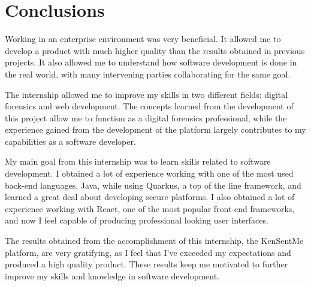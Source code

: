 

\chapter{Conclusions}
\label{ch:conclusion}

Working in an enterprise environment was very beneficial.
It allowed me to develop a product with much higher quality than the results obtained in previous projects.
It also allowed me to understand how software development is done in the real world, with many intervening parties collaborating for the same goal.

The internship allowed me to improve my skills in two different fields: digital forensics and web development.
The concepts learned from the development of this project allow me to function as a digital forensics professional, 
while the experience gained from the development of the platform largely contributes to my capabilities as a software developer.

My main goal from this internship was to learn skills related to software development.
I obtained a lot of experience working with one of the most used back-end languages, Java, while using Quarkus, a top of the line framework,
and learned a great deal about developing secure platforms.
I also obtained a lot of experience working with React, one of the most popular front-end frameworks, and now I feel capable of producing professional looking user interfaces.

The results obtained from the accomplishment of this internship, the KenSentMe platform, are very gratifying, as I feel that I've exceeded my expectations and produced a high quality product.
These results keep me motivated to further improve my skills and knowledge in software development.
